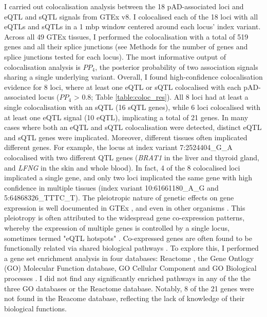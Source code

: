 I carried out colocalisation analysis between the 18 pAD-associated loci and eQTL and sQTL signals from GTEx v8. I colocalised each of the 18 loci with all eQTLs and sQTLs in a 1 mbp window centered around each locus' index variant. Across all 49 GTEx tissues, I performed the colocalisation with a total of 519 genes and all their splice junctions (see Methods for the number of genes and splice junctions tested for each locus). The most informative output of colocalisation analysis is $PP_{4}$, the posterior probability of two association signals sharing a single underlying variant. Overall, I found high-confidence colocalisation evidence for 8 loci, where at least one eQTL or sQTL colocalised with each pAD-associated locus ($PP_{4}$ > 0.8; Table \ref{table:coloc_res}). All 8 loci had at least a single colocalisation with an sQTL (16 sQTL genes), while 6 loci colocalised with at least one eQTL signal (10 eQTL), implicating a total of 21 genes. In many cases where both an eQTL and sQTL colocalisation were detected, distinct eQTL and sQTL genes were implicated. Moreover, different tissues often implicated different genes. For example, the locus at index variant 7:2524404\_G\_A colocalised with two different QTL genes (\textit{BRAT1} in the liver and thyroid gland, and \textit{LFNG} in the skin and whole blood). In fact, 4 of the 8 colocalised loci implicated a single gene, and only two loci implicated the same gene with high confidence in multiple tissues (index variant 10:61661180\_A\_G and 5:64868326\_TTTC\_T). The pleiotropic nature of genetic effects on gene expression is well documented in GTEx \cite{Ribeiro2021-xj}, and even in other organisms \cite{Brem2002-zj,Schadt2003-ei}. This pleiotropy is often attributed to the widespread gene co-expression patterns, whereby the expression of multiple genes is controlled by a single locus, sometimes termed "eQTL hotspots" \cite{Tian2016-hy}. Co-expressed genes are often found to be functionally related via shared biological pathways \cite{Van_Dam2017-vm,Westra2013-mm}. To explore this, I performed a gene set enrichment analysis in four databases: Reactome \cite{Gillespie2022-jr}, the Gene Ontlogy (GO) Molecular Function database, GO Cellular Component and GO Biological processes \cite{Thomas2022-nb}. I did not find any significantly enriched pathways in any of the the three GO databases or the Reactome database. Notably, 8 of the 21 genes were not found in the Reacome database, reflecting the lack of knowledge of their biological functions. 

